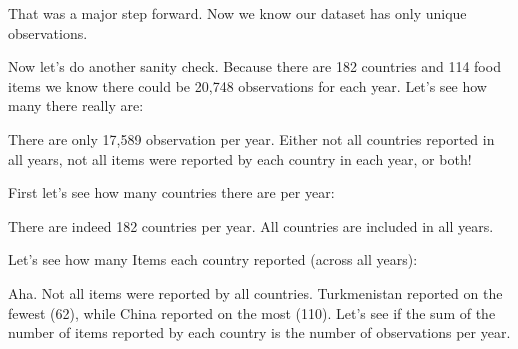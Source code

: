 \documentclass[]{book}
\newenvironment{Shaded}{\begin{snugshade}}{\end{snugshade}}
\newcommand{\DataTypeTok}[1]{\textcolor[rgb]{0.13,0.29,0.53}{#1}}
\newcommand{\KeywordTok}[1]{\textcolor[rgb]{0.13,0.29,0.53}{\textbf{#1}}}
\newcommand{\NormalTok}[1]{#1}
\newcommand{\OperatorTok}[1]{\textcolor[rgb]{0.81,0.36,0.00}{\textbf{#1}}}
\newcommand{\StringTok}[1]{\textcolor[rgb]{0.31,0.60,0.02}{#1}}
\begin{document}
That was a major step forward. Now we know our dataset has only unique observations.

Now let's do another sanity check. Because there are 182 countries and 114 food items we know there could be 20,748 observations for each year. Let's see how many there really are:

\begin{Shaded}
\end{Shaded}

There are only 17,589 observation per year. Either not all countries reported in all years, not all items were reported by each country in each year, or both!

First let's see how many countries there are per year:

\begin{Shaded}
\end{Shaded}

There are indeed 182 countries per year. All countries are included in all years.

Let's see how many Items each country reported (across all years):

\begin{Shaded}
\end{Shaded}

Aha. Not all items were reported by all countries. Turkmenistan reported on the fewest (62), while China reported on the most (110). Let's see if the sum of the number of items reported by each country is the number of observations per year.
\end{document}
